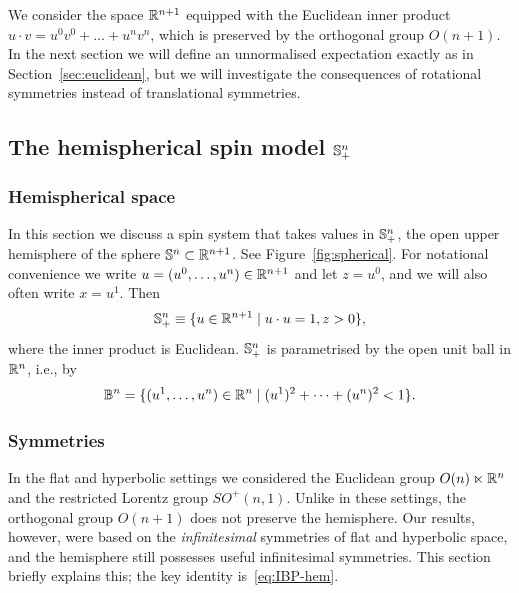 \documentclass[11pt,a4paper]{article}
\begin{document}
We consider the space $\mathbb{R}^{n+1}$ equipped with the Euclidean inner product 
$u \cdot v = u^{0}v^{0} + \dots + u^{n}v^{n}$,
which is preserved by the orthogonal group
$O(n+1)$.  In the next section we will
define an unnormalised expectation exactly as in
Section~\ref{sec:euclidean}, but we will investigate the
consequences of rotational symmetries instead of translational symmetries.

\subsection{The hemispherical spin model ${\mathbb S}^{n}_{+}$}
\label{sec:hemisph-spin-model}


\subsubsection{Hemispherical space}
\label{sec:hemispherical-space}

In this section we discuss a spin system that takes values in
${\mathbb S}^{n}_{+}$, the open upper hemisphere of the sphere
${\mathbb S}^{n}\subset \mathbb{R}^{n+1}$. See Figure~\ref{fig:spherical}.
For notational convenience we
 write $u = (u^0, \dots, u^n)\in \mathbb{R}^{n+1}$ and
let
$z=u^{0}$, and we will also often write
$x=u^{1}$. Then
\begin{equation}
  \label{eq:hemisphere}
  {\ensuremath{\mathbb S}}^{n}_{+} \equiv \{ u\in\mathbb{R}^{n+1} \mid u\cdot u = 1, z> 0 \},
\end{equation}
where the inner product is Euclidean.
${\mathbb S}^{n}_{+}$ is parametrised by the open unit ball in $\mathbb{R}^{n}$, i.e., by
\begin{equation}
  \label{eq:ball}
  {\ensuremath{\mathbb B}}^{n} = \{ (u^{1}, \dots, u^{n})\in \mathbb{R}^{n} \mid (u^{1})^{2} +
  \dots + (u^{n})^{2}< 1\}.
\end{equation}


\subsubsection{Symmetries}
In the flat and hyperbolic settings we considered the Euclidean group
$O(n) \ltimes \mathbb{R}^n$ and the restricted Lorentz group
$SO^{+}(n,1)$.  Unlike in these settings, the orthogonal group
$O(n+1)$ does not preserve the hemisphere. Our results, however, were
based on the \emph{infinitesimal} symmetries of flat and hyperbolic
space, and the hemisphere still possesses useful infinitesimal
symmetries. This section briefly explains this; the key identity
is~\eqref{eq:IBP-hem}.
\end{document}
